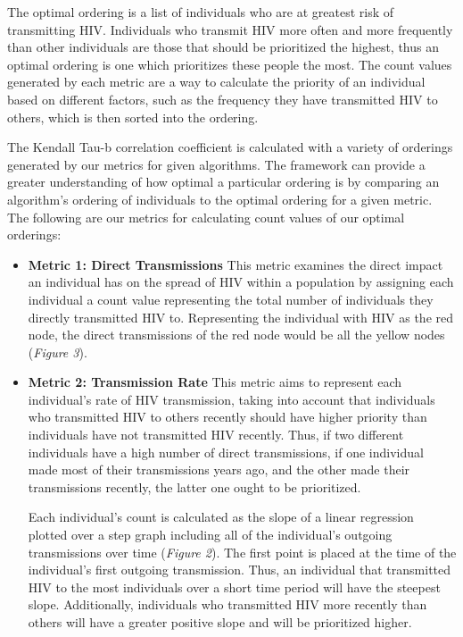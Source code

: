 \documentclass[twocolumn]{bmcart}%
\begin{document}
\begin{multicols}
The optimal ordering is a list of individuals who are at greatest risk of transmitting HIV. Individuals who transmit HIV more often and more frequently than other individuals are those that should be prioritized the highest, thus an optimal ordering is one which prioritizes these people the most. The count values generated by each metric are a way to calculate the priority of an individual based on different factors, such as the frequency they have transmitted HIV to others, which is then sorted into the ordering.

The Kendall Tau-b correlation coefficient is calculated with a variety of orderings generated by our metrics for given algorithms. The framework can provide a greater understanding of how optimal a particular ordering is by comparing an algorithm's ordering of individuals to the optimal ordering for a given metric. The following are our metrics for calculating count values of our optimal orderings:
\newline\newline
\begin{itemize}

\item \textbf{Metric 1: Direct Transmissions} This metric examines the direct impact an individual has on the spread of HIV within a population by assigning each individual a count value representing the total number of individuals they directly transmitted HIV to. Representing the individual with HIV as the red node, the direct transmissions of the red node would be all the yellow nodes (\textit{Figure 3}).\newline\newline

\item \textbf{Metric 2: Transmission Rate} This metric aims to represent each individual's rate of HIV transmission, taking into account that individuals who transmitted HIV to others recently should have higher priority than individuals have not transmitted HIV recently. Thus, if two different individuals have a high number of direct transmissions, if one individual made most of their transmissions years ago, and the other made their transmissions recently, the latter one ought to be prioritized.

Each individual's count is calculated as the slope of a linear regression  plotted over a step graph including all of the individual's outgoing transmissions over time (\textit{Figure 2}). The first point is placed at the time of the individual's first outgoing transmission. Thus, an individual that transmitted HIV to the most individuals over a short time period will have the steepest slope. Additionally, individuals who transmitted HIV more recently than others will have a greater positive slope and will be prioritized higher. 
\newline\newline


\end{itemize}
\end{multicols}
\end{document}
